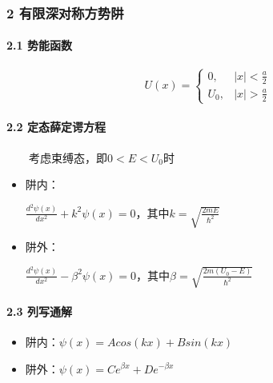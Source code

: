 \documentclass[UTF8,twocolumn]{ctexart}
\providecommand{\tightlist}{%
  \setlength{\itemsep}{0pt}\setlength{\parskip}{0pt}}
\let\oldparagraph\paragraph
\renewcommand{\paragraph}[1]{\oldparagraph{#1}\mbox{}}
\begin{document}
\hypertarget{ux6709ux9650ux6df1ux5bf9ux79f0ux65b9ux52bfux9631}{%
\subsubsection{2
有限深对称方势阱}\label{ux6709ux9650ux6df1ux5bf9ux79f0ux65b9ux52bfux9631}}

\hypertarget{ux52bfux80fdux51fdux6570-1}{%
\paragraph{{ }2.1 势能函数}\label{ux52bfux80fdux51fdux6570-1}}

\[U(x)=\begin{cases} 
        0, & |x|<\frac{a}{2}\\
        U_0, & |x|>\frac{a}{2}
\end{cases}\]

\hypertarget{ux5b9aux6001ux859bux5b9aux8c14ux65b9ux7a0b-3}{%
\paragraph{{ }2.2
定态薛定谔方程}\label{ux5b9aux6001ux859bux5b9aux8c14ux65b9ux7a0b-3}}

  考虑束缚态，即\(0<E<U_0\)时 

\begin{itemize}
  \tightlist
  \item
    阱内：
    \begin{center}
      \(\frac{d^2\psi(x)}{dx^2}+k^2\psi(x)=0\)，其中\(k=\sqrt{\frac{2mE}{\hbar^2}}\)
    \end{center}
  \item
    阱外：
    \begin{center}
      \(\frac{d^2\psi(x)}{dx^2}-\beta^2\psi(x)=0\)，其中\(\beta=\sqrt{\frac{2m(U_0-E)}{\hbar^2}}\)
    \end{center}
\end{itemize}

\hypertarget{ux5217ux5199ux901aux89e3-1}{%
\paragraph{{ }2.3 列写通解}\label{ux5217ux5199ux901aux89e3-1}}

\begin{itemize}
\tightlist
\item
  阱内：\(\psi(x)=Acos(kx)+Bsin(kx)\)
\item
  阱外：\(\psi(x)=Ce^{\beta x}+De^{-\beta x}\)
\end{itemize}
\end{document}
